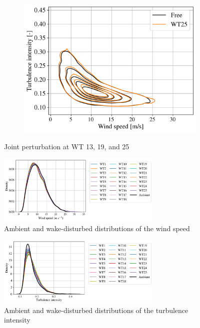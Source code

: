 \begin{figure}
\begin{subfigure}[b]{0.3\textwidth}
        \includegraphics[width=\textwidth]{part2/figures/WAKE/joint_perturbation_SB_WT25.png}
    \end{subfigure}
    \caption{Joint perturbation at WT 13, 19, and 25}
\label{fig:FIGJointPerturbationSB}
\end{figure}

\begin{figure}
    \centering
    \includegraphics[width=0.7\textwidth]{part2/figures/WAKE/perturbed_wsp_distribution_SB.png}
    \caption{Ambient and wake-disturbed distributions of the wind speed}
\label{FIGMarginalWSP}
\end{figure}

\begin{figure}
    \centering
    \includegraphics[width=0.7\textwidth]{part2/figures/WAKE/perturbed_ti_distribution_SB.png}
    \caption{Ambient and wake-disturbed distributions of the turbulence intensity}
\label{FIGMarginalTI}
\end{figure}




